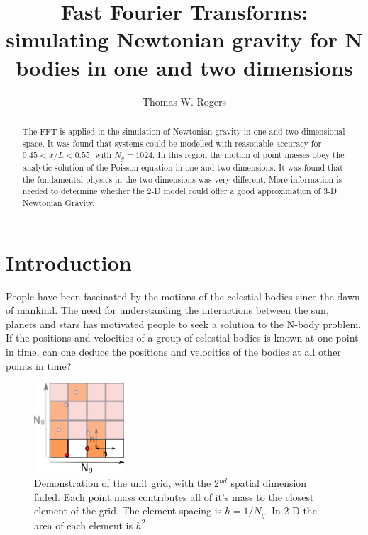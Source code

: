 \documentclass[10pt,a4paper]{article}
\begin{document}
\title{\bfseries \LARGE Fast Fourier Transforms: simulating Newtonian gravity for N bodies in one and two dimensions}
\author{Thomas W. Rogers}
\maketitle
\begin{abstract}
The FFT is applied in the simulation of Newtonian gravity in one and two dimensional space. It was found that systems could be modelled with reasonable accuracy for $ 0.45 < x/L<0.55$, with $N_g = 1024$. In this region the motion of point masses obey the analytic solution of the Poisson equation in one and two dimensions. It was found that the fundamental physics in the two dimensions was very different. More information is needed to determine whether the 2-D model could offer a good approximation of 3-D Newtonian Gravity.


\end{abstract}
\section{Introduction}
People have been fascinated by the motions of the celestial bodies since the dawn of mankind. The need for understanding the interactions between the sun, planets and stars has motivated people to seek a solution to the N-body problem. If the positions and velocities of a group of celestial bodies is known at one point in time, can one deduce the positions and velocities of the bodies at all other points in time? 

\begin{figure}
\begin{center}
\includegraphics[width =0.3\textwidth]{grid.eps}
\caption{Demonstration of the unit grid, with the 2$^{nd}$ spatial dimension faded. Each point mass contributes all of it's mass to the closest element of the grid. The element spacing is $h=1/N_g$. In 2-D the area of each element is $h^2$}
\label{fig:Setup}
\end{center}
\end{figure}
\end{document}
